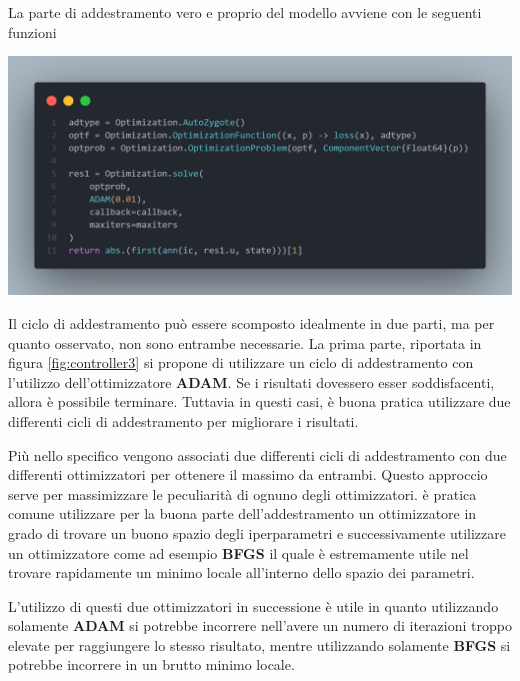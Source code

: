 La parte di addestramento vero e proprio del modello avviene con le seguenti funzioni

\begin{minipage}{\linewidth}
	\centering
	\includegraphics[width=\textwidth]{img/controller3.png}
	\label{fig:controller3}
\end{minipage}

Il ciclo di addestramento può essere scomposto idealmente in due parti, ma per quanto osservato, non sono 
entrambe necessarie. La prima parte, riportata in figura \ref{fig:controller3} si propone di utilizzare un ciclo di addestramento 
con l'utilizzo dell'ottimizzatore \textbf{ADAM}. Se i risultati dovessero esser soddisfacenti, allora è possibile terminare. 
Tuttavia in questi casi, è buona pratica utilizzare due differenti cicli di addestramento per migliorare i risultati. 

Più nello specifico vengono associati due differenti cicli di addestramento con due differenti ottimizzatori per ottenere il massimo 
da entrambi. Questo approccio serve per massimizzare le peculiarità di ognuno degli ottimizzatori. è pratica comune utilizzare per la 
buona parte dell'addestramento un ottimizzatore in grado di trovare un buono spazio degli iperparametri e successivamente utilizzare 
un ottimizzatore come ad esempio \textbf{BFGS} \cite{10.1093/imamat/6.1.76} \cite{35d0019d-775a-3628-b0b4-67be112e346b} \cite{10.1093/comjnl/13.3.317} \cite{e3177091-3094-3792-9d61-0ab445735ddb}
il quale è estremamente utile nel trovare rapidamente un minimo locale all'interno dello spazio dei parametri.

L'utilizzo di questi due ottimizzatori in successione è utile in quanto utilizzando solamente \textbf{ADAM} si potrebbe 
incorrere nell'avere un numero di iterazioni troppo elevate per raggiungere lo stesso risultato, mentre utilizzando solamente \textbf{BFGS} si 
potrebbe incorrere in un brutto minimo locale.

